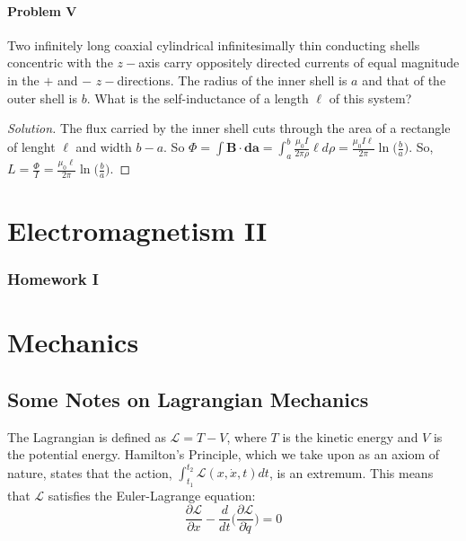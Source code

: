 \documentclass[oneside]{book}
\theoremstyle{definition}
\newcommand*\B[1]{\mathbf{#1}}
\begin{document}
\subsubsection{Problem V}
Two infinitely long coaxial cylindrical infinitesimally thin conducting shells concentric with the $z-$axis carry oppositely directed currents of equal magnitude in the $+$ and $-$ $z-$directions. The radius of the inner shell is $a$ and that of the outer shell is $b$. What is the self-inductance of a length $\ell$ of this system?
\begin{proof}[Solution]
The flux carried by the inner shell cuts through the area of a rectangle of lenght $\ell$ and width $b-a$. So $\Phi = \int \B{B}\cdot \B{da} = \int_{a}^{b} \frac{\mu_0 I}{2\pi \rho}\ell d\rho = \frac{\mu_0 I\ell}{2\pi}\ln\big(\frac{b}{a}\big)$. So, $L = \frac{\Phi}{I} = \frac{\mu_0 \ell}{2\pi}\ln\big(\frac{b}{a}\big)$.
\end{proof}






\chapter{Electromagnetism II}

\subsection*{Homework I}

\chapter{Mechanics}

\section{Some Notes on Lagrangian Mechanics}

The Lagrangian is defined as $\mathcal{L} = T-V$, where $T$ is the kinetic energy and $V$ is the potential energy. Hamilton's Principle, which we take upon as an axiom of nature, states that the action, $\int_{t_1}^{t_2} \mathcal{L}(x,\dot{x},t)dt$, is an extremum. This means that $\mathcal{L}$ satisfies the Euler-Lagrange equation:
\begin{equation} 
\nonumber \frac{\partial \mathcal{L}}{\partial x} - \frac{d}{dt}\big(\frac{\partial \mathcal{L}}{\partial \dot{q}}\big) = 0
\end{equation}
\end{document}
